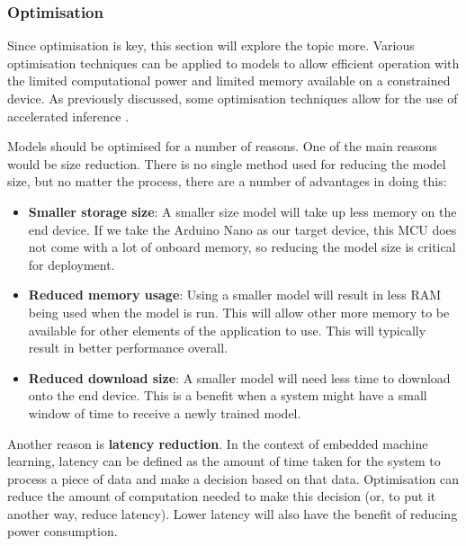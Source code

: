 \documentclass[conference]{IEEEtran}
\begin{document}

\subsubsection{Optimisation} Since optimisation is key, this section will explore the topic more. Various optimisation techniques can be applied to models to allow efficient operation with the limited computational power and limited memory available on a constrained device. As previously discussed, some optimisation techniques allow for the use of accelerated inference \cite{b13}.

Models should be optimised for a number of reasons. One of the main reasons would be size reduction. There is no single method used for reducing the model size, but no matter the process, there are a number of advantages in doing this:

\begin{itemize}
    \item \textbf{Smaller storage size}: A smaller size model will take up less memory on the end device. If we take the Arduino Nano as our target device, this MCU does not come with a lot of onboard memory, so reducing the model size is critical for deployment.
    \item \textbf{Reduced memory usage}: Using a smaller model will result in less RAM being used when the model is run. This will allow other more memory to be available for other elements of the application to use. This will typically result in better performance overall.
    \item \textbf{Reduced download size}: A smaller model will need less time to download onto the end device. This is a benefit when a system might have a small window of time to receive a newly trained model.
\end{itemize}

Another reason is \textbf{latency reduction}. In the context of embedded machine learning, latency can be defined as the amount of time taken for the system to process a piece of data and make a decision based on that data. Optimisation can reduce the amount of computation needed to make this decision (or, to put it another way, reduce latency). Lower latency will also have the benefit of reducing power consumption.
\end{document}
